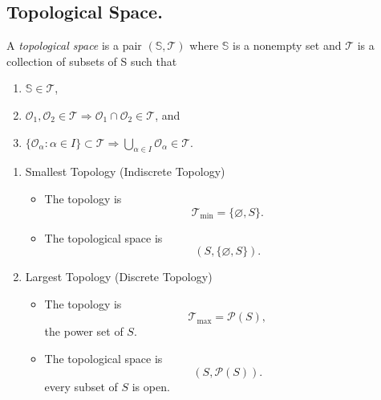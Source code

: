 \documentclass[11pt]{article}
\theoremstyle{definition}
\begin{document}
\subsection{Topological Space.}
\label{subsec:measures:topological-space} A \emph{topological space} is a pair $(\mathbb{S}, \mathcal{T})$ where $\mathbb{S}$ is a nonempty set and $\mathcal{T}$ is a collection of subsets of S such that
\begin{enumerate}[label=(\roman*), itemsep=0.5em, topsep=0.5em]
  \item $\mathbb{S} \in \mathcal{T}$,
  \item $\mathcal{O}_1, \mathcal{O}_2 \in \mathcal{T} \Rightarrow \mathcal{O}_1 \cap \mathcal{O}_2 \in \mathcal{T}$, and
  \item $\{\mathcal{O}_\alpha : \alpha \in I\} \subset \mathcal{T} \Rightarrow \bigcup_{\alpha \in I} \mathcal{O}_\alpha \in \mathcal{T}$.
\end{enumerate}
\begin{enumerate}
    \item Smallest Topology (Indiscrete Topology)
    \begin{itemize}
        \item [] The topology is
          \[
             \mathcal{T}_{\min} = \{\varnothing, S\}.
          \]
        \item [] The topological space is
          \[
              (S, \{\varnothing, S\}).        
          \]
    \end{itemize}
    \item Largest Topology (Discrete Topology)
    \begin{itemize}
        \item [] The topology is
          \[
             \mathcal{T}_{\max} = \mathcal{P}(S),
          \]
          the power set of $S$.
        \item [] The topological space is
          \[
              (S, \mathcal{P}(S)).        
          \]
          every subset of $S$ is open.
    \end{itemize}
\end{enumerate}
\end{document}

